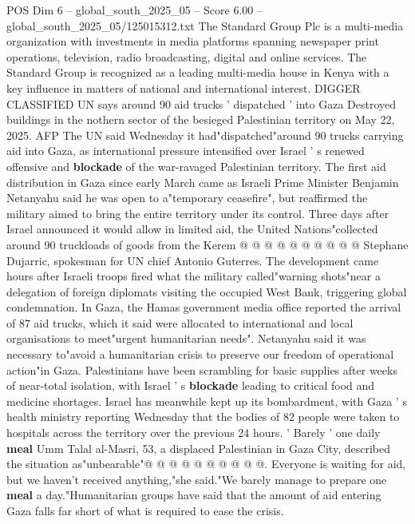 \begin{textsample}{POS Dim 6 – global\_south\_2025\_05 – Score 6.00 – global\_south\_2025\_05/125015312.txt}  \label{ex:f6_pos_039}
The Standard Group Plc is a multi-media organization with investments in media platforms spanning newspaper print operations, television, radio broadcasting, digital and online services.
The Standard Group is recognized as a leading multi-media house in Kenya with a key influence in matters of national and international interest.
DIGGER CLASSIFIED UN says around 90 aid trucks ' dispatched ' into Gaza Destroyed buildings in the nothern sector of the besieged Palestinian territory on May 22, 2025.
AFP The UN said Wednesday it had"dispatched"around 90 trucks carrying aid into Gaza, as international pressure intensified over Israel ' s renewed offensive and \textbf{blockade} of the war-ravaged Palestinian territory.
The first aid distribution in Gaza since early March came as Israeli Prime Minister Benjamin Netanyahu said he was open to a"temporary ceasefire", but reaffirmed the military aimed to bring the entire territory under its control.
Three days after Israel announced it would allow in limited aid, the United Nations"collected around 90 truckloads of goods from the Kerem @ @ @ @ @ @ @ @ @ @ Stephane Dujarric, spokesman for UN chief Antonio Guterres.
The development came hours after Israeli troops fired what the military called"warning shots"near a delegation of foreign diplomats visiting the occupied West Bank, triggering global condemnation.
In Gaza, the Hamas government media office reported the arrival of 87 aid trucks, which it said were allocated to international and local organisations to meet"urgent humanitarian needs".
Netanyahu said it was necessary to"avoid a humanitarian crisis to preserve our freedom of operational action"in Gaza.
Palestinians have been scrambling for basic supplies after weeks of near-total isolation, with Israel ' s \textbf{blockade} leading to critical food and medicine shortages.
Israel has meanwhile kept up its bombardment, with Gaza ' s health ministry reporting Wednesday that the bodies of 82 people were taken to hospitals across the territory over the previous 24 hours. ' Barely ' one daily \textbf{meal} Umm Talal al-Masri, 53, a displaced Palestinian in Gaza City, described the situation as"unbearable"@ @ @ @ @ @ @ @ @ @.
Everyone is waiting for aid, but we haven't received anything,"she said."We barely manage to prepare one \textbf{meal} a day."Humanitarian groups have said that the amount of aid entering Gaza falls far short of what is required to ease the crisis.

\end{textsample}
